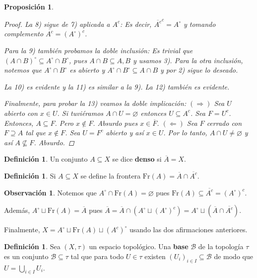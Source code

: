 \documentclass[12pt]{book}
\newtheorem{prop}[teo]{Proposición}
\theoremstyle{definition}
\newtheorem{obs}[teo]{Observación}
\newtheorem{defn}[teo]{Definición}
\let\emptyset\varnothing
\begin{document}
\begin{prop}
\begin{proof}
La 8) sigue de 7) aplicada a $A^c$: Es decir, $\overline{A^c}^c = A^\circ$ y tomando complemento $\overline{A^c} = (A^\circ)^c$.

Para la 9) también probamos la doble inclusión: Es trivial que $(A\cap B)^\circ \subseteq A^\circ \cap B^\circ$, pues $A\cap B \subseteq A,B$ y usamos 3). Para la otra inclusión, notemos que $A^\circ\cap B^\circ$ es abierto y $A^\circ \cap B^\circ \subseteq A\cap B$ y por 2) sigue lo deseado.

La 10) es evidente y la 11) es similar a la 9). La 12) también es evidente.

Finalmente, para probar la 13) veamos la doble implicación: $(\Longrightarrow)$ Sea $U$ abierto con $x\in U$. Si tuviéramos $A\cap U=\emptyset$ entonces $U\subseteq A^c$. Sea $F=U^c$. Entonces, $A\subseteq F$. Pero $x\notin F$. Absurdo pues $x\in \overline{F}$.
$(\Longleftarrow)$ Sea $F$ cerrado con $F\supseteq A$ tal que $x\notin F$. Sea $U=F^c$ abierto y así $x\in U$. Por lo tanto, $A\cap U\neq \emptyset$ y así $A\not\subseteq F$. Absurdo.

\end{proof}
\end{prop}

\begin{defn}
Un conjunto $A\subseteq X$ se dice \textbf{denso} si $\overline{A}=X$.
\end{defn}

\begin{defn}
Si $A\subseteq X$ se define la frontera $\mathrm{Fr}(A) = \overline{A}\cap \overline{A^c}$.
\end{defn}

\begin{obs}
Notemos que $A^\circ \cap \mathrm{Fr}(A)=\emptyset$ pues $\mathrm{Fr}(A)\subseteq \overline{A^c} = (A^\circ)^c$.

Además, $A^\circ \sqcup \mathrm{Fr}(A) = \overline{A}$ pues $\overline{A} = \overline{A}\cap (A^\circ \sqcup (A^\circ)^c) = A^\circ \sqcup (\overline{A}\cap \overline{A^c})$.

Finalmente, $X=A^\circ \sqcup \mathrm{Fr}(A) \sqcup (A^c)^\circ$ usando las dos afirmaciones anteriores.
\end{obs}

\begin{defn}
Sea $(X,\tau)$ un espacio topológico. Una \textbf{base} $\mathscr{B}$ de la topología $\tau$ es un conjunto $\mathscr{B}\subseteq \tau$ tal que para todo $U\in\tau$ existen $(U_i)_{i\in I}\subseteq \mathscr{B}$ de modo que $U = \displaystyle\bigcup_{i\in I}U_i$.
\end{defn}
\end{document}
